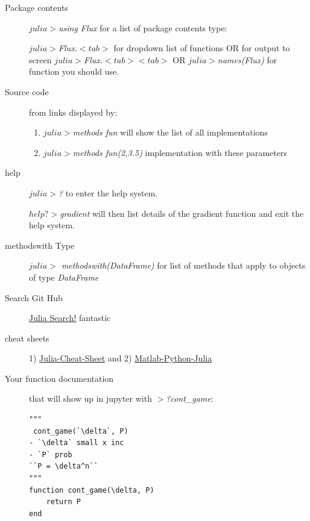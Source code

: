 \begin{description}

\item[Package contents] \emph{$julia>$using Flux} for a list of package contents type:

 \emph{$julia>$Flux.$<tab>$} for dropdown list of functions OR for output to screen
 \emph{$julia>$Flux.$<tab><tab>$} OR
 \emph{$julia>$names(Flux)} for function you should use.
 \item[Source code] from links displayed by:
 \begin{enumerate}
 \item \emph{$julia>$methods  fun}  will show the list of all  implementations
 \item \emph{$julia>$methods  fun(2,3.5)}  implementation with these parameters
  \end{enumerate}
 \item [help] \emph{$julia>$?} to enter the help system.
 
 \emph{$help?>$gradient}  will then list details of the gradient function and exit the help system.
 
 \item [methodswith Type]   \emph{$julia>$ methodswith(DataFrame)}  for list of methods that apply to objects of type \emph{DataFrame}
 \item [Search Git Hub]  \href{https://juliahub.com/ui/Search?q=&type=packages&t=function&u=define} {Julia Search!} fantastic
 
\item [cheat sheets] 1) \href{https://juliadocs.github.io/Julia-Cheat-Sheet/} {Julia-Cheat-Sheet}
and 2) \href{https://cheatsheets.quantecon.org/} {Matlab-Python-Julia}
 
 
 \item [Your function documentation] that will show up in jupyter with \emph{$>$?cont\_game}:
 \begin{verbatim}
"""
 cont_game(`\delta`, P) 
- `\delta` small x inc
- `P` prob  
``P = \delta^n``
"""
function cont_game(\delta, P) 
    return P
end
\end{verbatim}
\end{description}
 
